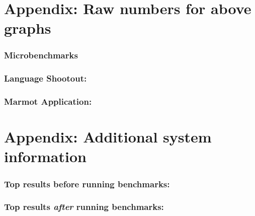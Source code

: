 \documentclass{article}
\begin{document}





\appendix
\section{Appendix: Raw numbers for above graphs}

\subsubsection*{Microbenchmarks}
{\footnotesize

}

\subsubsection*{Language Shootout:}
{\footnotesize
}

\subsubsection*{Marmot Application:}
{\footnotesize
}

\section{Appendix: Additional system information}

\subsubsection*{Top results before running benchmarks:}
{
\footnotesize

}
\subsubsection*{Top results {\em after} running benchmarks:}
{
\footnotesize

}
\end{document}
